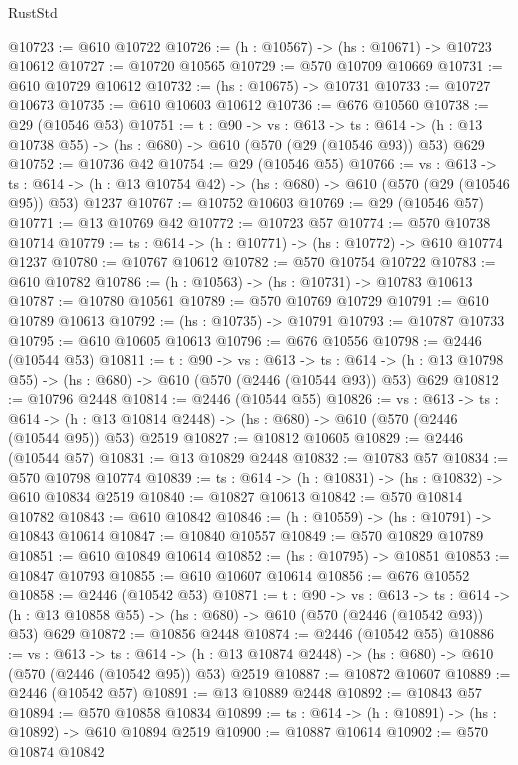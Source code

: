\begin{lexlean}{RustStd}
\begin{coremodule}
@10723 := @610 @10722
@10726 := (h : @10567) -> (hs : @10671) -> @10723 @10612
@10727 := @10720 @10565
@10729 := @570 @10709 @10669
@10731 := @610 @10729 @10612
@10732 := (hs : @10675) -> @10731
@10733 := @10727 @10673
@10735 := @610 @10603 @10612
@10736 := @676 @10560
@10738 := @29 (@10546 @53)
@10751 := {t : @90} ->
  {vs : @613} ->
  {ts : @614} -> (h : @13 @10738 @55) -> (hs : @680) -> @610 (@570 (@29 (@10546 @93)) @53) @629
@10752 := @10736 @42
@10754 := @29 (@10546 @55)
@10766 := {vs : @613} ->
  {ts : @614} -> (h : @13 @10754 @42) -> (hs : @680) -> @610 (@570 (@29 (@10546 @95)) @53) @1237
@10767 := @10752 @10603
@10769 := @29 (@10546 @57)
@10771 := @13 @10769 @42
@10772 := @10723 @57
@10774 := @570 @10738 @10714
@10779 := {ts : @614} -> (h : @10771) -> (hs : @10772) -> @610 @10774 @1237
@10780 := @10767 @10612
@10782 := @570 @10754 @10722
@10783 := @610 @10782
@10786 := (h : @10563) -> (hs : @10731) -> @10783 @10613
@10787 := @10780 @10561
@10789 := @570 @10769 @10729
@10791 := @610 @10789 @10613
@10792 := (hs : @10735) -> @10791
@10793 := @10787 @10733
@10795 := @610 @10605 @10613
@10796 := @676 @10556
@10798 := @2446 (@10544 @53)
@10811 := {t : @90} ->
  {vs : @613} ->
  {ts : @614} -> (h : @13 @10798 @55) -> (hs : @680) -> @610 (@570 (@2446 (@10544 @93)) @53) @629
@10812 := @10796 @2448
@10814 := @2446 (@10544 @55)
@10826 := {vs : @613} ->
  {ts : @614} -> (h : @13 @10814 @2448) -> (hs : @680) -> @610 (@570 (@2446 (@10544 @95)) @53) @2519
@10827 := @10812 @10605
@10829 := @2446 (@10544 @57)
@10831 := @13 @10829 @2448
@10832 := @10783 @57
@10834 := @570 @10798 @10774
@10839 := {ts : @614} -> (h : @10831) -> (hs : @10832) -> @610 @10834 @2519
@10840 := @10827 @10613
@10842 := @570 @10814 @10782
@10843 := @610 @10842
@10846 := (h : @10559) -> (hs : @10791) -> @10843 @10614
@10847 := @10840 @10557
@10849 := @570 @10829 @10789
@10851 := @610 @10849 @10614
@10852 := (hs : @10795) -> @10851
@10853 := @10847 @10793
@10855 := @610 @10607 @10614
@10856 := @676 @10552
@10858 := @2446 (@10542 @53)
@10871 := {t : @90} ->
  {vs : @613} ->
  {ts : @614} -> (h : @13 @10858 @55) -> (hs : @680) -> @610 (@570 (@2446 (@10542 @93)) @53) @629
@10872 := @10856 @2448
@10874 := @2446 (@10542 @55)
@10886 := {vs : @613} ->
  {ts : @614} -> (h : @13 @10874 @2448) -> (hs : @680) -> @610 (@570 (@2446 (@10542 @95)) @53) @2519
@10887 := @10872 @10607
@10889 := @2446 (@10542 @57)
@10891 := @13 @10889 @2448
@10892 := @10843 @57
@10894 := @570 @10858 @10834
@10899 := {ts : @614} -> (h : @10891) -> (hs : @10892) -> @610 @10894 @2519
@10900 := @10887 @10614
@10902 := @570 @10874 @10842

\end{coremodule}
\end{lexlean}
